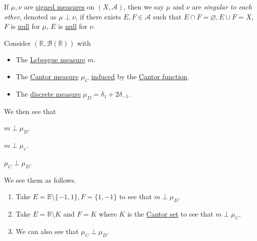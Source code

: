\begin{definition}[Singular]\label{def:singular}
	If \(\mu,\nu\) are \hyperref[def:signed-measure]{signed measures} on \((X, \mathcal{A})\), then we say \(\mu\) and \(\nu \) are \emph{singular to each other}, denoted as
	\(\mu \perp \nu\), if there exists \(E,F \in \mathcal{A}\) such that \(E \cap F = \varnothing, E \cup F = X\), \(F\) is \hyperref[def:null-set-for-a-signed-measure]{null}
	for \(\mu\), \(E\) is \hyperref[def:null-set-for-a-signed-measure]{null} for \(\nu\).
\end{definition}

\begin{eg}
	Consider \((\mathbb{R}, \mathcal{B}(\mathbb{R}))\) with
	\begin{itemize}
		\item The \hyperref[def:Lebesgue-measure]{Lebesgue measure} \(m\).
		\item The \hyperref[def:Cantor-measure]{Cantor measure} \(\mu_C\) \hyperref[def:Lebesgue-Stieltjes-measure]{induced} by the \hyperref[sssec:Cantor-Function]{Cantor function}.
		\item The \hyperref[eg:discrete-measure]{discrete measure} \(\mu_D = \delta_1 + 2\delta_{-1}\).
	\end{itemize}

	We then see that
	\begin{enumerate*}[(1)]
		\item \(m\perp \mu _D\).
		\item \(m\perp \mu _c\).
		\item \(\mu _C \perp \mu _D\).
	\end{enumerate*}
\end{eg}
\begin{explanation}
	We see them as follows.
	\begin{enumerate}[(1)]
		\item Take \(E = \mathbb{R} \setminus \{-1,1\}, F = \{1,-1\}\) to see that \(m \perp \mu_D\).
		\item Take \(E = \mathbb{R} \setminus K\) and \(F = K\) where \(K\) is the \hyperref[eg:lec8:Cantor-set]{Cantor set} to see that \(m \perp \mu_C\).
		\item We can also see that \(\mu_C \perp \mu_D\).
	\end{enumerate}
\end{explanation}

